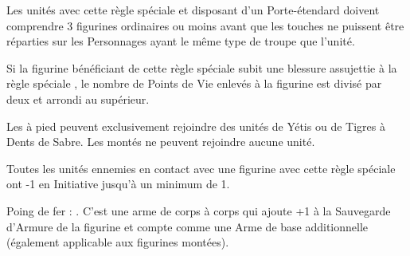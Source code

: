 \armyspecialruleentry{\scraplinglookout}

Les unités avec cette règle spéciale et disposant d'un Porte-étendard doivent comprendre 3 figurines ordinaires ou moins avant que les touches ne puissent être réparties sur les Personnages ayant le même type de troupe que l'unité.

\armyspecialruleentry{\rockskeleton}

Si la figurine bénéficiant de cette règle spéciale subit une blessure assujettie à la règle spéciale \multiplewounds{}{}, le nombre de Points de Vie enlevés à la figurine est divisé par deux et arrondi au supérieur.

\armyspecialruleentry{\loner}

Les  à pied peuvent exclusivement rejoindre des unités de Yétis ou de Tigres à Dents de Sabre. Les  montés ne peuvent rejoindre aucune unité.

\armyspecialruleentry{\touchoffrost}

Toutes les unités ennemies en contact avec une figurine avec cette règle spéciale ont -1 en Initiative jusqu'à un minimum de 1.

\armyarmoury


\begin{customdescription}
\item[Poing de fer :] \requirestwohands . C'est une arme de corps à corps qui ajoute +1 à la Sauvegarde d'Armure de la figurine et compte comme une Arme de base additionnelle (également applicable aux figurines montées).
\end{customdescription}


